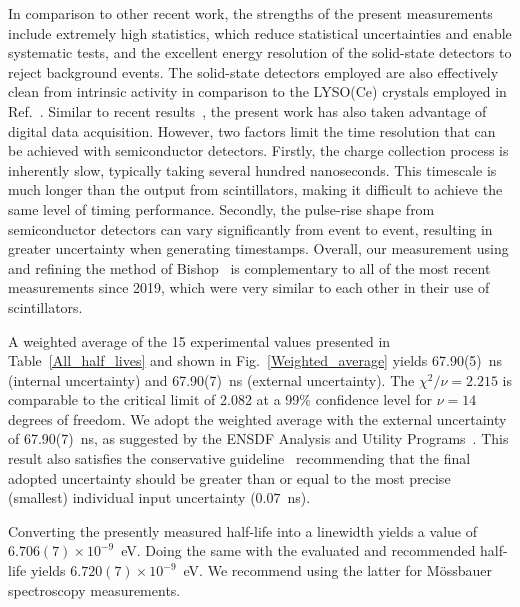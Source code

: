 \documentclass[aps,UTF8,prc,twocolumn,preprintnumbers,amsmath,amssymb,floatfix]{revtex4-2}
\begin{document}
In comparison to other recent work, the strengths of the present measurements include extremely high statistics, which reduce statistical uncertainties and enable systematic tests, and the excellent energy resolution of the solid-state detectors to reject background events. The solid-state detectors employed are also effectively clean from intrinsic activity in comparison to the LYSO(Ce) crystals employed in Ref.~\cite{Santos_NPA2023}. Similar to recent results~\cite{Vretenar_AJP2019,Takacs_ARI2021,Dutsov_ARI2021,Santos_NPA2023}, the present work has also taken advantage of digital data acquisition. However, two factors limit the time resolution that can be achieved with semiconductor detectors. Firstly, the charge collection process is inherently slow, typically taking several hundred nanoseconds. This timescale is much longer than the output from scintillators, making it difficult to achieve the same level of timing performance. Secondly, the pulse-rise shape from semiconductor detectors can vary significantly from event to event, resulting in greater uncertainty when generating timestamps. Overall, our measurement using and refining the method of Bishop~\cite{Bishop_NIM1974} is complementary to all of the most recent measurements since 2019, which were very similar to each other in their use of scintillators. 

A weighted average of the 15 experimental values presented in Table~\ref{All_half_lives} and shown in Fig.~\ref{Weighted_average} yields 67.90(5)~ns (internal uncertainty) and 67.90(7)~ns (external uncertainty). The $\chi^{2}/\nu=2.215$ is comparable to the critical limit of 2.082 at a 99\% confidence level for $\nu=14$ degrees of freedom. We adopt the weighted average with the external uncertainty of 67.90(7)~ns, as suggested by the ENSDF Analysis and Utility Programs~\cite{ENSDF_Codes}. This result also satisfies the conservative guideline~\cite{Ricard-McCutchan_NSDD2015} recommending that the final adopted uncertainty should be greater than or equal to the most precise (smallest) individual input uncertainty ($0.07$~ns).

Converting the presently measured half-life into a linewidth yields a value of $6.706(7)\times10^{-9}$~eV. Doing the same with the evaluated and recommended half-life yields $6.720(7)\times10^{-9}$~eV. We recommend using the latter for M\"{o}ssbauer spectroscopy measurements. 
\end{document}

